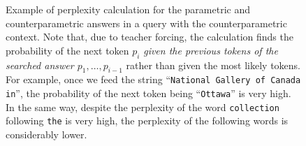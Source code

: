 \begin{figure}[p]

	\caption{Example of perplexity calculation for the parametric and counterparametric answers in a query with the counterparametric context. Note that, due to teacher forcing, the calculation finds the probability of the next token $p_i$ \textit{given the previous tokens of the searched answer $p_1, \dots, p_{i - 1}$} rather than given the most likely tokens. For example, once we feed the string ``\texttt{National Gallery of Canada in}'', the probability of the next token being ``\texttt{Ottawa}'' is very high. In the same way, despite the perplexity of the word \texttt{collection} following \texttt{the} is very high, the perplexity of the following words is considerably lower.}
	\label{example_perplexity}
\end{figure}
